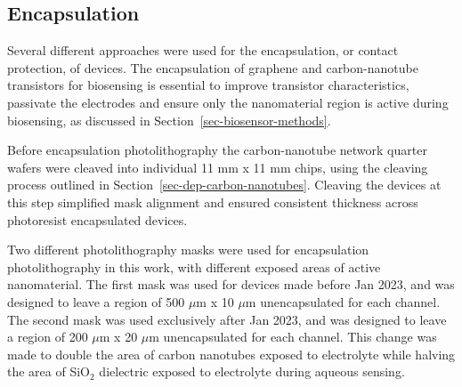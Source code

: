\documentclass[
  a4paper,
]{scrbook}
\begin{document}
\hypertarget{sec-encapsulation}{%
\subsection{Encapsulation}\label{sec-encapsulation}}

Several different approaches were used for the encapsulation, or contact
protection, of devices. The encapsulation of graphene and
carbon-nanotube transistors for biosensing is essential to improve
transistor characteristics, passivate the electrodes and ensure only the
nanomaterial region is active during biosensing, as discussed in
Section~\ref{sec-biosensor-methods}.

Before encapsulation photolithography the carbon-nanotube network
quarter wafers were cleaved into individual 11 mm x 11 mm chips, using
the cleaving process outlined in Section~\ref{sec-dep-carbon-nanotubes}.
Cleaving the devices at this step simplified mask alignment and ensured
consistent thickness across photoresist encapsulated devices.

Two different photolithography masks were used for encapsulation
photolithography in this work, with different exposed areas of active
nanomaterial. The first mask was used for devices made before Jan 2023,
and was designed to leave a region of 500 \(\mu\)m x 10 \(\mu\)m
unencapsulated for each channel. The second mask was used exclusively
after Jan 2023, and was designed to leave a region of 200 \(\mu\)m x 20
\(\mu\)m unencapsulated for each channel. This change was made to double
the area of carbon nanotubes exposed to electrolyte while halving the
area of SiO\(_2\) dielectric exposed to electrolyte during aqueous
sensing.
\end{document}
